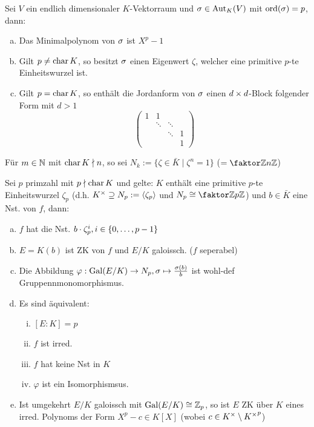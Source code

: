 \documentclass[a4paper]{report}
\begin{document}
\begin{prop}
  Sei $V$ ein endlich dimensionaler $K$-Vektorraum und $\sigma \in \operatorname{Aut}_{K}(V)$ mit $\operatorname{ord}(\sigma) = p$, dann:
  \begin{enumerate}[(a)]
    \item Das Minimalpolynom von $\sigma$ ist $X^{p} - 1$
    \item Gilt $p \ne \operatorname{char} K$, so besitzt $\sigma$ einen Eigenwert $\zeta$, welcher eine primitive $p$-te Einheitswurzel ist.
    \item Gilt $p = \operatorname{char} K$, so enthält die Jordanform von $\sigma$ einen $d \times d$-Block folgender Form mit $d > 1$
          \[\begin{pmatrix}
              1 & 1 \\
                & \ddots & \ddots \\
                & & \ddots & 1\\
              & & & 1
            \end{pmatrix}\]
  \end{enumerate}
\end{prop}
\begin{nota*}
Für $m \in \mathbb{N}$ mit $\operatorname{char} K \nmid n$, so sei $N_{k}:= \{\zeta \in \bar K \mid \zeta^{n} = 1\}$ ($= \fak \Z{n\Z}$)
\end{nota*}

\begin{satz}[Kummererweiterungen]
  Sei $p$ primzahl mit $p \nmid \operatorname{char} K$ und gelte: $K$ enthält eine primitive $p$-te Einheitswurzel $\zeta_{p}$ (d.h. $K^\times \supseteq N_{p} := \langle\zeta_{p}\rangle$ und $N_{p} \cong \fak \Z{p\Z}$) und $b \in \bar K$ eine Nst. von $f$, dann:
  \begin{enumerate}[(a)]
    \item $f$ hat die Nst. $b \cdot \zeta_{p}^{i}, i \in \{0, \ldots ,p-1\}$
    \item $E = K(b)$ ist ZK von $f$ und $E / K$ galoissch. ($f$ seperabel)
    \item Die Abbildung $\varphi : \operatorname{Gal}(E/K) \to N_{p}, \sigma \mapsto \frac {\sigma(b)}b$ ist wohl-def Gruppennmonomorphismus.
    \item Es sind äquivalent:
          \begin{enumerate}[(i)]
            \item $[E:K] = p$
            \item $f$ ist irred.
            \item $f$ hat keine Nst in $K$
                  \item $\varphi$ ist ein Isomorphismsus.
          \end{enumerate}
\item Ist umgekehrt $E / K$ galoissch mit $\operatorname{Gal}(E/K) \cong \mathbb{Z}_{p}$, so ist $E$ ZK über $K$ eines irred. Polynoms der Form $X^{p} - c \in K[X]$ (wobei $c \in K^\times \setminus {K^\times}^{p}$)
  \end{enumerate}
\end{satz}
\end{document}
